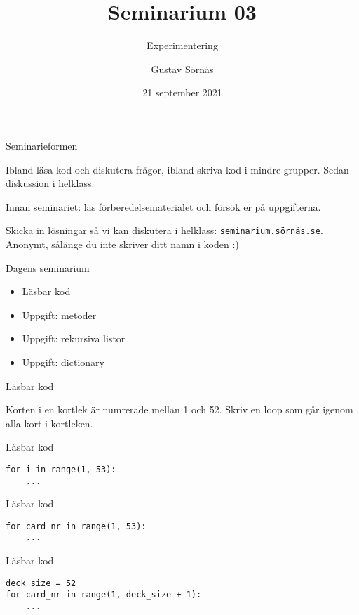 \documentclass{beamer}
\title{Seminarium 03}
\subtitle{Experimentering}
\date{21 september 2021}
\author{Gustav Sörnäs}
\begin{document}
  \frame{\titlepage}

  \begin{frame}{Seminarieformen}

    Ibland läsa kod och diskutera frågor, ibland skriva kod i mindre grupper.
    Sedan diskussion i helklass.

    Innan seminariet: läs förberedelsematerialet och försök er på uppgifterna.

    Skicka in lösningar så vi kan diskutera i helklass:
    \texttt{seminarium.sörnäs.se}. Anonymt, sålänge du inte skriver ditt namn i
    koden :)

  \end{frame}

  \begin{frame}{Dagens seminarium}

    \begin{itemize}
      \item Läsbar kod
      \item Uppgift: metoder
      \item Uppgift: rekursiva listor
      \item Uppgift: dictionary
    \end{itemize}

  \end{frame}

  \begin{frame}{Läsbar kod}

    Korten i en kortlek är numrerade mellan 1 och 52. Skriv en loop som går
    igenom alla kort i kortleken.

  \end{frame}

  \begin{frame}[fragile]{Läsbar kod}

    \begin{verbatim}
for i in range(1, 53):
    ...
    \end{verbatim}

  \end{frame}

  \begin{frame}[fragile]{Läsbar kod}

    \begin{verbatim}
for card_nr in range(1, 53):
    ...
    \end{verbatim}

  \end{frame}

  \begin{frame}[fragile]{Läsbar kod}

    \begin{verbatim}
deck_size = 52
for card_nr in range(1, deck_size + 1):
    ...
    \end{verbatim}

  \end{frame}
\end{document}
